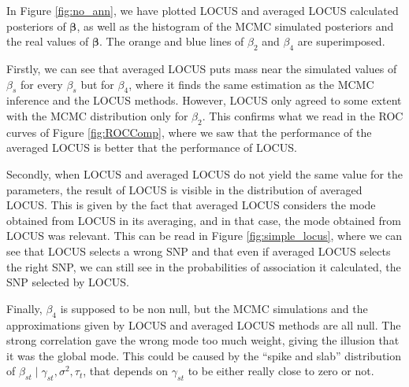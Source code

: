 \documentclass[a4paper, 11pt]{report}
\numberwithin{equation}{chapter}
\begin{document}
In Figure \ref{fig:no_ann}, we have plotted LOCUS and averaged LOCUS calculated posteriors of $\boldsymbol{\beta}$, as well as the histogram of the MCMC simulated posteriors and the real values of $\boldsymbol{\beta}$. The orange and blue lines of $\beta_2$ and $\beta_4$ are superimposed.

Firstly, we can see that averaged LOCUS puts mass near the simulated values of $\beta_s$ for every $\beta_s$ but for $\beta_4$, where it finds the same estimation as the MCMC inference and the LOCUS methods. However, LOCUS only agreed to some extent with the MCMC distribution only for $\beta_2$. This confirms what we read in the ROC curves of Figure \ref{fig:ROCComp}, where we saw that the performance of the averaged LOCUS is better that the performance of LOCUS.

Secondly, when LOCUS and averaged LOCUS do not yield the same value for the parameters, the result of LOCUS is visible in the distribution of averaged LOCUS. This is given by the fact that averaged LOCUS considers the mode obtained from LOCUS in its averaging, and in that case, the mode obtained from LOCUS was relevant. This can be read in Figure \ref{fig:simple_locus}, where we can see that LOCUS selects a wrong SNP and that even if averaged LOCUS selects the right SNP, we can still see in the probabilities of association it calculated, the SNP selected by LOCUS.

Finally, $\beta_4$ is supposed to be non null, but the MCMC simulations and the approximations given by LOCUS and averaged LOCUS methods are all null. The strong correlation gave the wrong mode too much weight, giving the illusion that it was the global mode. This could be caused by the ``spike and slab'' distribution of $\beta_{st}\mid \gamma_{st}, \sigma^2, \tau_t$, that depends on $\gamma_{st}$ to be either really close to zero or not.
\end{document}
